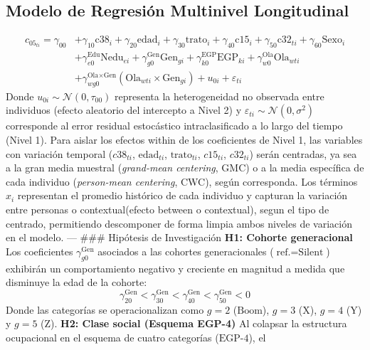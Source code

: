 \documentclass[
  spanish,
  a4paper,
  oneside]{scrbook}
\begin{document}
\subsection{Modelo de Regresión Multinivel
Longitudinal}\label{modelo-de-regresiuxf3n-multinivel-longitudinal}

\[
\begin{aligned}
c_{05_{ti}} = \gamma_{00} 
&+ \gamma_{10}\text{c38}_{i} + \gamma_{20}\text{edad}_{i} + \gamma_{30}\text{trato}_{i} + \gamma_{40}\text{c15}_{i} + \gamma_{50}\text{c32}_{ti} + \gamma_{60}\text{Sexo}_{i} \\
&+ \gamma^{\text{Edu}}_{e0}\text{Nedu}_{ei} + \gamma^{\text{Gen}}_{g0}\text{Gen}_{gi} + \gamma^{\text{EGP}}_{k0}\text{EGP}_{ki} + \gamma^{\text{Ola}}_{w0}\text{Ola}_{wti} \\
&+ \gamma^{\text{Ola}\times\text{Gen}}_{wg0} (\text{Ola}_{wti} \times \text{Gen}_{gi}) + u_{0i} + \varepsilon_{ti}
\end{aligned}
\] Donde \(u_{0i} \sim \mathcal{N}(0, \tau_{00})\) representa la
heterogeneidad no observada entre individuos (efecto aleatorio del
intercepto a Nivel 2) y
\(\varepsilon_{ti} \sim \mathcal{N}(0, \sigma^2)\) corresponde al error
residual estocástico intraclasificado a lo largo del tiempo (Nivel 1).
Para aislar los efectos within de los coeficientes de Nivel 1, las
variables con variación temporal (\(c38_{ti}\), \(\text{edad}_{ti}\),
\(\text{trato}_{ti}\), \(c15_{ti}\), \(c32_{ti}\)) serán centradas, ya
sea a la gran media muestral (\textit{grand-mean centering}, GMC) o a la
media específica de cada individuo (\textit{person-mean centering},
CWC), según corresponda. Los términos \(x_{i}\) representan el promedio
histórico de cada individuo y capturan la variación entre personas o
contextual(efecto between o contextual), segun el tipo de centrado,
permitiendo descomponer de forma limpia ambos niveles de variación en el
modelo. --- \#\#\# Hipótesis de Investigación \textbf{H1: Cohorte
generacional} Los coeficientes \(\gamma^{\text{Gen}}_{g0}\) asociados a
las cohortes generacionales (\(\text{ref.} = \text{Silent}\)) exhibirán
un comportamiento negativo y creciente en magnitud a medida que
disminuye la edad de la cohorte:
\[\gamma^{\text{Gen}}_{20} < \gamma^{\text{Gen}}_{30} < \gamma^{\text{Gen}}_{40} < \gamma^{\text{Gen}}_{50} < 0\]
Donde las categorías se operacionalizan como \(g=2\) (\(\text{Boom}\)),
\(g=3\) (\(\text{X}\)), \(g=4\) (\(\text{Y}\)) y \(g=5\) (\(\text{Z}\)).
\textbf{H2: Clase social (Esquema EGP-4)} Al colapsar la estructura
ocupacional en el esquema de cuatro categorías (\(\text{EGP-4}\)), el
\end{document}
